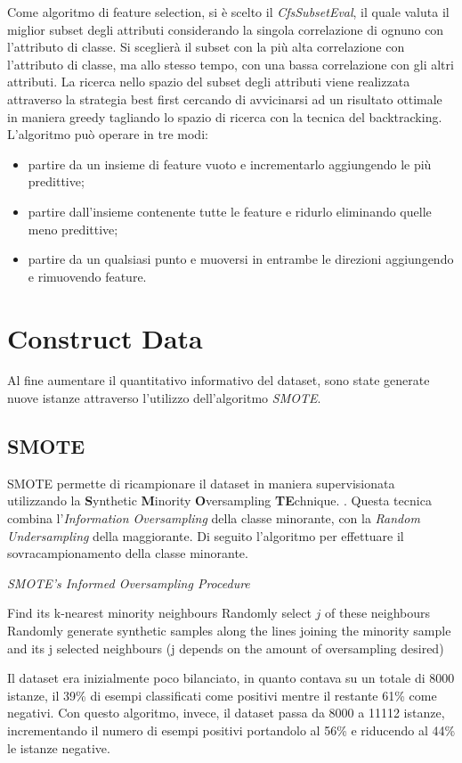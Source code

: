 Come algoritmo di feature selection, si è scelto il \textit{CfsSubsetEval}, il quale valuta il miglior subset degli attributi considerando la singola correlazione di ognuno con l'attributo di classe. Si sceglierà il subset con la più alta correlazione con l'attributo di classe, ma allo stesso tempo, con una bassa correlazione con gli altri attributi. La ricerca nello spazio del subset degli attributi viene realizzata attraverso la strategia best first cercando di avvicinarsi ad un risultato ottimale in maniera greedy tagliando lo spazio di ricerca con la tecnica del backtracking.\cite{Hall1998}
L'algoritmo può operare in tre modi:
\begin{itemize}
	\item partire da un insieme di feature vuoto e incrementarlo aggiungendo le più predittive;
	\item partire dall'insieme contenente tutte le feature e ridurlo eliminando quelle meno predittive;
	\item partire da un qualsiasi punto e muoversi in entrambe le direzioni aggiungendo e rimuovendo feature.
\end{itemize}
\section{Construct Data}
Al fine aumentare il quantitativo informativo del dataset, sono state generate nuove istanze attraverso l'utilizzo dell'algoritmo \textit{SMOTE}.
\subsection{SMOTE}
\label{SMOTE}
SMOTE permette di ricampionare il dataset in maniera supervisionata utilizzando la \textbf{S}ynthetic \textbf{M}inority \textbf{O}versampling \textbf{TE}chnique. 
\cite{Chawla02smote:synthetic}. Questa tecnica combina l'\emph{Information Oversampling} della classe minorante, con la \emph{Random Undersampling} della maggiorante. Di seguito l'algoritmo per effettuare il sovracampionamento della classe minorante.
\begin{algorithm}
	\caption{\emph{SMOTE’s Informed Oversampling Procedure}}
	\begin{algorithmic} 
		\STATE Find its k-nearest minority neighbours
		\STATE Randomly select $j$ of these neighbours
		\STATE Randomly generate synthetic samples along the lines joining the minority sample and its j selected neighbours
		(j depends on the amount of oversampling desired) 
		\ENDFOR
	\end{algorithmic}
\end{algorithm}
Il dataset era inizialmente poco bilanciato, in quanto contava su un totale di 8000 istanze, il 39\% di esempi classificati come positivi mentre il restante 61\% come negativi. Con questo algoritmo, invece, il dataset passa da 8000 a 11112 istanze, incrementando il numero di esempi positivi portandolo al 56\% e riducendo al 44\% le istanze negative.
